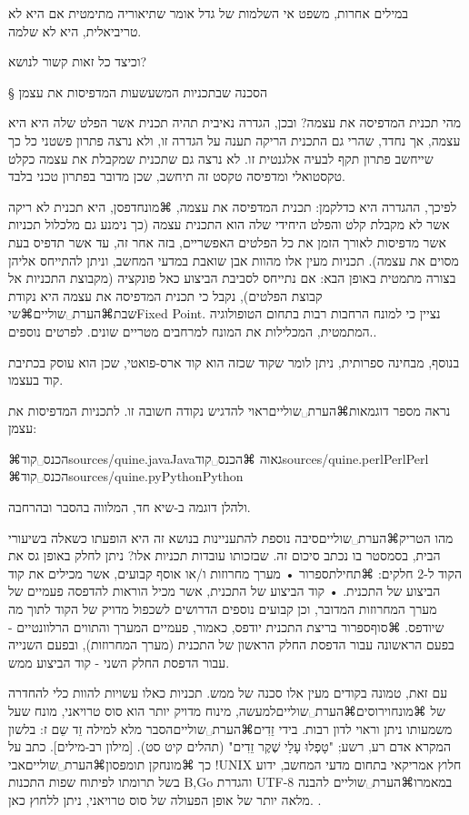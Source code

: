 { במילים אחרות, משפט אי השלמות של גדל אומר שתיאוריה מתימטית אם היא לא טריביאלית, היא לא שלמה. 

וכיצד כל זאות קשור לנושא?
\newpage


§ הסכנה שבתכניות המשעשעות המדפיסות את עצמן

מהי תכנית המדפיסה את עצמה? ובכן, הגדרה נאיבית תהיה תכנית אשר הפלט שלה היא היא עצמה, אך נחדד, שהרי גם התכנית הריקה תענה על הגדרה זו, ולא נרצה פתרון פשטני כל כך שייחשב פתרון תקף לבעיה אלגנטית זו. לא נרצה גם שתכנית שמקבלת את עצמה כקלט טקסטואלי ומדפיסה טקסט זה תיחשב, שכן מדובר בפתרון טכני בלבד. 

לפיכך, ההגדרה היא כדלקמן: תכנית המדפיסה את עצמה, ⌘מונח{דפסן}, היא תכנית לא ריקה אשר לא מקבלת קלט והפלט היחידי שלה הוא התכנית עצמה (כך נימנע גם מלכלול תכניות אשר מדפיסות לאורך הזמן את כל הפלטים האפשריים, בזה אחר זה, עד אשר תדפיס בעת מסוים את עצמה). תכניות מעין אלו מהוות אבן שואבת במדעי המחשב, וניתן להתייחס אליהן בצורה מתמטית באופן הבא: אם נתייחס לסביבת הביצוע כאל פונקציה (מקבוצת התכניות אל קבוצת הפלטים), נקבל כי תכנית המדפיסה את עצמה היא נקודת שבת⌘הערת␣שוליים{⌘שי{Fixed Point}. נציין כי למונח הרחבות רבות בתחום הטופולוגיה המתמטית, המכלילות את המונח למרחבים מטריים שונים. לפרטים נוספים.}. 

בנוסף, מבחינה ספרותית, ניתן לומר שקוד שכזה הוא קוד ארס-פואטי, שכן הוא עוסק בכתיבת קוד בעצמו. 

נראה מספר דוגמאות⌘הערת␣שוליים{ראוי להדגיש נקודה חשובה זו.} לתכניות המדפיסות את עצמן:


⌘הכנס␣קוד{sources/quine.java}{Java}{גאוה}
⌘הכנס␣קוד{sources/quine.perl}{Perl}{Perl}
⌘הכנס␣קוד{sources/quine.py}{Python}{Python}



ולהלן דוגמה ב-שיא חד, המלווה בהסבר ובהרחבה.



מהו הטריק⌘הערת␣שוליים{סיבה נוספת להתעניינות בנושא זה היא הופעתו כשאלה בשיעורי הבית, בסמסטר בו נכתב סיכום זה.} שבזכותו עובדות תכניות אלו? ניתן לחלק באופן גס את הקוד ל-2 חלקים: 
⌘תחילת{ספרור}
• מערך מחרוזות ו/או אוסף קבועים, אשר מכילים את קוד הביצוע של התכנית.
• קוד הביצוע של התכנית, אשר מכיל הוראות להדפסה פעמיים של מערך המחרוזות המדובר, וכן קבועים נוספים הדרושים לשכפול מדויק של הקוד לתוך מה שיודפס. 
⌘סוף{ספרור}
בריצת התכנית יודפס, כאמור, פעמיים המערך והתווים הרלוונטיים - בפעם הראשונה עבור הדפסת החלק הראשון של התכנית (מערך המחרוזות), ובפעם השנייה עבור הדפסת החלק השני - קוד הביצוע ממש. 

עם זאת, טמונה בקודים מעין אלו סכנה של ממש. תכניות כאלו עשויות להוות כלי להחדרה של ⌘מונח{וירוסים}⌘הערת␣שוליים{למעשה, מינוח מדויק יותר הוא סוס טרויאני, מונח שעל משמעותו ניתן וראוי לדון רבות.} בידי זֵדִים⌘הערת␣שוליים{הסבר מלא למילה זֵד שֵם ז: בלשון המקרא אדם רע, רשע; "טָפְלוּ עָלַי שֶׁקֶר זֵדִים" (תהלים קיט סט). [מילון רב-מילים]}. כתב על כך ⌘מונח{קן תומפסון}⌘הערת␣שוליים{אבי !UNIX חלוץ אמריקאי בתחום מדעי המחשב, ידוע בשל תרומתו לפיתוח שפות התכנות B,Go והגדרת UTF-8} במאמרו⌘הערת␣שוליים {להבנה מלאה יותר של אופן הפעולה של סוס טרויאני, ניתן ללחוץ כאן.
 }.

}
